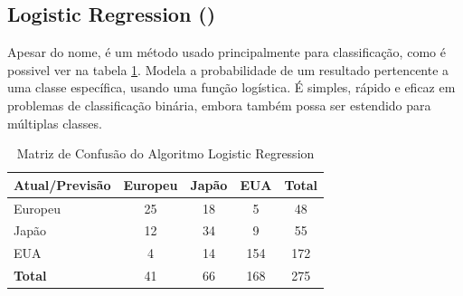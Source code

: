 \documentclass[conference]{IEEEtran}
\begin{document}
\subsection{Logistic Regression (\cite{regression})}
Apesar do nome, é um método usado principalmente para classificação, como é possivel ver na tabela \ref{tab:conf_matrix_logistic}.
Modela a probabilidade de um resultado pertencente a uma classe específica, usando uma função logística. É simples, rápido e eficaz
em problemas de classificação binária, embora também possa ser estendido para múltiplas classes.
\begin{table}[!ht]
	\centering
	\begin{tabular}{lcccc}
		\toprule
		\textbf{Atual/Previsão} & \textbf{Europeu} & \textbf{Japão} & \textbf{EUA} & \textbf{Total} \\
		\midrule
		Europeu                 & 25               & 18             & 5           & 48             \\
		Japão                   & 12               & 34             & 9           & 55             \\
		EUA                     & 4               & 14             & 154          & 172            \\
		\midrule
		\textbf{Total}          & 41               & 66             & 168          & 275            \\
		\bottomrule
	\end{tabular}
	\caption{Matriz de Confusão do Algoritmo Logistic Regression}
	\label{tab:conf_matrix_logistic}

\end{table}

\end{document}
